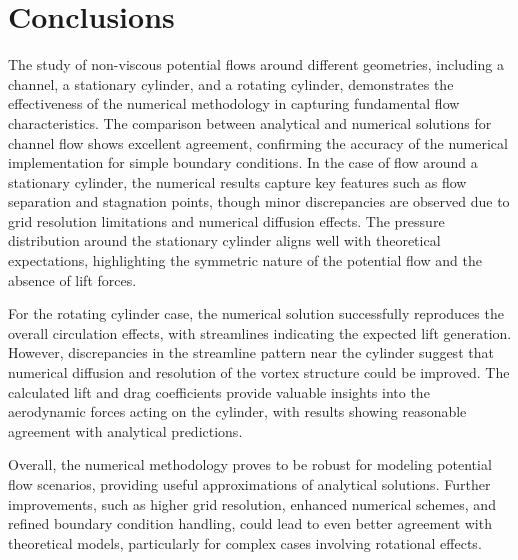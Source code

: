 \newpage

\section{\textbf{Conclusions}}

\bigskip

The study of non-viscous potential flows around different geometries, including a channel, a stationary cylinder, and a rotating cylinder, demonstrates the effectiveness of the numerical methodology in capturing fundamental flow characteristics. The comparison between analytical and numerical solutions for channel flow shows excellent agreement, confirming the accuracy of the numerical implementation for simple boundary conditions. In the case of flow around a stationary cylinder, the numerical results capture key features such as flow separation and stagnation points, though minor discrepancies are observed due to grid resolution limitations and numerical diffusion effects. The pressure distribution around the stationary cylinder aligns well with theoretical expectations, highlighting the symmetric nature of the potential flow and the absence of lift forces.

For the rotating cylinder case, the numerical solution successfully reproduces the overall circulation effects, with streamlines indicating the expected lift generation. However, discrepancies in the streamline pattern near the cylinder suggest that numerical diffusion and resolution of the vortex structure could be improved. The calculated lift and drag coefficients provide valuable insights into the aerodynamic forces acting on the cylinder, with results showing reasonable agreement with analytical predictions. 

Overall, the numerical methodology proves to be robust for modeling potential flow scenarios, providing useful approximations of analytical solutions. Further improvements, such as higher grid resolution, enhanced numerical schemes, and refined boundary condition handling, could lead to even better agreement with theoretical models, particularly for complex cases involving rotational effects.
